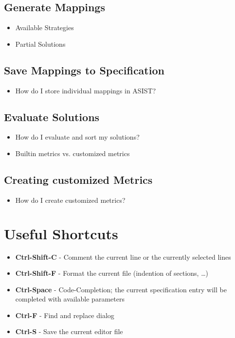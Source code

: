 \subsection{Generate Mappings}

\begin{itemize}
\item Available Strategies
\item Partial Solutions
\end{itemize}

\subsection{Save Mappings to Specification}

\begin{itemize}
\item How do I store individual mappings in ASIST?
\end{itemize}

\subsection{Evaluate Solutions}

\begin{itemize}
\item How do I evaluate and sort my solutions?
\item Builtin metrics vs. customized metrics
\end{itemize}

\subsection{Creating customized Metrics}

\begin{itemize}
\item How do I create customized metrics?
\end{itemize}

\section{Useful Shortcuts}

\begin{itemize}
\item \textbf{Ctrl-Shift-C} - Comment the current line or the currently selected lines
\item \textbf{Ctrl-Shift-F} - Format the current file (indention of sections, \dots)
\item \textbf{Ctrl-Space} - Code-Completion; the current specification entry will be completed with available parameters
\item \textbf{Ctrl-F} - Find and replace dialog
\item \textbf{Ctrl-S} - Save the current editor file
\end{itemize}

